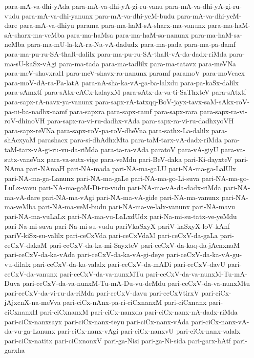 {para-mA-va-dhi-yAda
para-mA-va-dhi-yA-gi-ru-vanu
para-mA-va-dhi-yA-gi-ru-vudu
para-mA-va-dhi-yanunx
para-mA-va-dhi-yeM-budu
para-mA-va-dhi-yeM-dare
para-mA-va-dhiyu
parama
para-ma-haM-sA-sharx-ma-vanunx
para-ma-haM-sA-sharx-ma-veMba
para-ma-haMsa
para-ma-haM-sa-nanunx
para-ma-haM-sa-neMba
para-ma-mU-la-kA-ra-Na-vA-dadudx
para-ma-pada
para-ma-pa-damf
para-ma-pu-ru-SA-thaR-dalilx
para-ma-pu-ru-SA-thaR-vA-da-dadx-riMda
para-ma-sU-kaSx-vAgi
para-ma-tada
para-ma-tadlilx
para-ma-tatavx
para-meVNa
para-meV-shavxraH
para-meV-shavx-ra-nanunx
paramf
paramoV
para-moVcacx
para-moV-dA-ra-Pa-latA
para-nA-sha-ka-vA-ga-ba-lalxdu
para-pa-kaSx-dalilx
para-sAmxtf
para-sAtx-cACx-kalayxM
para-sAtx-da-va-ti-SaThxteV
para-sAtxtf
para-sapx-rA-navx-ya-vanunx
para-sapx-rA-tatxqq-BoV-jayx-tavx-saM-sAkx-roV-pa-ni-ba-nadhx-namf
para-sapxra
para-sapx-ramf
para-sapx-rara
para-sapx-ra-vi-roV-dhinoVH
para-sapx-ra-vi-ru-dadhx-vAda
para-sapx-ra-vi-ru-dadhxyoVH
para-sapx-reVNa
para-sapx-roV-pa-roV-dheVna
para-sathx-La-dalilx
para-shAcxyaM
parashacx
para-si-dhAdhxMta
para-taM-tarx-vA-dadx-riMda
para-taM-tarx-vA-gi-ru-vu-da-riMda
para-ta-ra-vAda
paratoV
para-vA-giyU
para-va-sutx-vaneVnx
para-va-sutx-vige
para-veMdu
pari-BeV-daka
pari-Ki-dayxteV
pari-NAma
pari-NAmaH
pari-NA-mada
pari-NA-ma-gaLU
pari-NA-ma-ga-LalUlx
pari-NA-ma-ga-Lanunx
pari-NA-ma-gaLe
pari-NA-ma-go-Li-suva
pari-NA-ma-go-LuLx-vavu
pari-NA-ma-goM-Di-ru-vudu
pari-NA-ma-vA-da-dadx-riMda
pari-NA-ma-vA-dare
pari-NA-ma-vAgi
pari-NA-ma-vA-gide
pari-NA-ma-vanunx
pari-NA-ma-veMba
pari-NA-ma-veM-budu
pari-NA-ma-ve-lalx-vanunx
pari-NA-mavu
pari-NA-ma-vuLaLx
pari-NA-ma-vu-LaLxdUdx
pari-Na-mi-su-tatx-ve-yeMdu
pari-Na-mi-suva
pari-Na-mi-su-vudu
pariVkaSxyX
pariV-kaSxyX-loV-kAnf
pariV-kiSx-su-valilx
pari-ceCxVda
pari-ceCxVdaM
pari-ceCxV-da-gaLa
pari-ceCxV-dakaM
pari-ceCxV-da-ka-mi-SayxteV
pari-ceCxV-da-kaq-da-jAcnxnaM
pari-ceCxV-da-ka-vAda
pari-ceCxV-da-ka-vA-gi-deye
pari-ceCxV-da-ka-vA-gu-vu-dilalx
pari-ceCxV-da-ka-valalx
pari-ceCxV-da-mADi
pari-ceCxV-davU
pari-ceCxV-da-vanunx
pari-ceCxV-da-va-nunxMTu
pari-ceCxV-da-va-nunxM-Tu-mA-Duva
pari-ceCxV-da-va-nunxM-Tu-mA-Du-vu-deMdu
pari-ceCxV-da-va-nunxMtu
pari-ceCxV-da-vi-ru-da-riMda
pari-ceCxV-davu
pari-ceCxVtirxV
pari-ciCx-jAjxcnX-na-meVva
pari-ciCx-nAnx-pa-ri-ciCxnanxM
pari-ciCxnanx
pari-ciCxnanxH
pari-ciCxnanxM
pari-ciCx-nanxda
pari-ciCx-nanx-nA-dadx-riMda
pari-ciCx-nanxsayx
pari-ciCx-nanx-teyu
pari-ciCx-nanx-vAda
pari-ciCx-nanx-vA-da-vu-ga-Lanunx
pari-ciCx-nanx-vAgi
pari-ciCx-nanxvU
pari-ciCx-nanx-valalx
pari-ciCx-natitx
pari-ciCxnonxV
pari-ga-Nisi
pari-ga-Ni-sida
pari-garx-hAtf
pari-garxha
}
